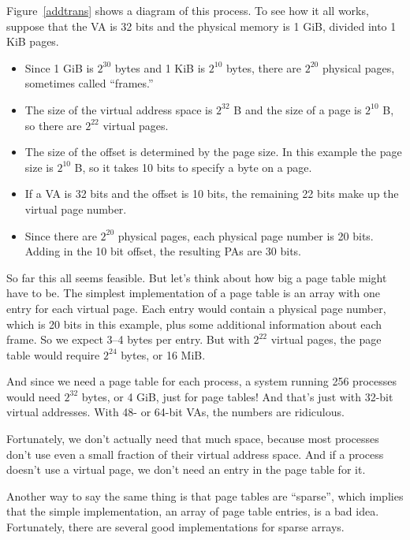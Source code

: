 \documentclass[12pt]{book}
\begin{document}
{Figure~\ref{addtrans} shows a diagram of this process.
To see how it all works, suppose that the VA is 32 bits and the physical memory is 1 GiB, divided into 1 KiB pages.

\begin{itemize}

\item Since 1 GiB is $2^{30}$ bytes and 1 KiB is $2^{10}$ bytes, there
  are $2^{20}$ physical pages, sometimes called ``frames.''

\item The size of the virtual address space is $2^{32}$ B and the size
  of a page is $2^{10}$ B, so there are $2^{22}$ virtual pages.

\item The size of the offset is determined by the page size.  In this
  example the page size is $2^{10}$ B, so it takes 10 bits to specify
  a byte on a page.

\item If a VA is 32 bits and the offset is 10 bits, the remaining
  22 bits make up the virtual page number.

\item Since there are $2^{20}$ physical pages, each physical page
  number is 20 bits.  Adding in the 10 bit offset, the resulting
  PAs are 30 bits.

\end{itemize}

So far this all seems feasible.  But let's think about how big a page
table might have to be.  The simplest implementation of a page
table is an array with one entry for each virtual page.
Each entry would contain a physical page number, which is 20 bits
in this example, plus some additional information about each
frame.  So we expect 3--4 bytes per entry.  But with $2^{22}$ virtual pages,
the page table would require $2^{24}$ bytes, or 16 MiB.

And since we need a page table for each process, a system running
256 processes would need $2^{32}$ bytes, or 4 GiB, just for page tables!
And that's just with 32-bit virtual addresses.  With 48- or 64-bit
VAs, the numbers are ridiculous.

Fortunately, we don't actually need that much space, because
most processes don't use even a small fraction of their
virtual address space.  And if a process doesn't use a virtual
page, we don't need an entry in the page table for it.

Another way to say the same thing is that page tables are ``sparse'',
which implies that the simple implementation, an array of page
table entries, is a bad idea.  Fortunately, there are several
good implementations for sparse arrays.

}
\end{document}
